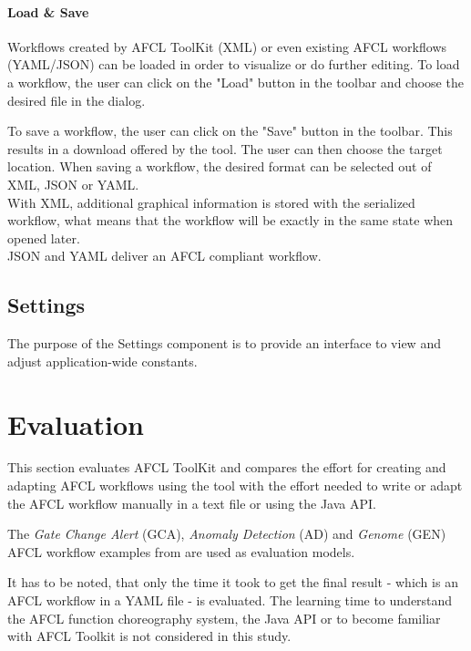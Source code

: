 \documentclass[a4paper,top=25mm,bottom=25mm,12pt,pdftex,halfparskip,twoside,bibtotoc,numbers=noenddot]{scrbook}
\begin{document}
\subsubsection{Load \& Save}

Workflows created by AFCL ToolKit (XML) or even existing AFCL workflows (YAML/JSON) can be loaded in order to visualize or do further editing. To load a workflow, the user can click on the "Load" button in the toolbar and choose the desired file in the dialog.

To save a workflow, the user can click on the "Save" button in the toolbar.
This results in a download offered by the tool. The user can then choose the target location.  When saving a workflow, the desired format can be selected out of XML, JSON or YAML.\\
With XML, additional graphical information is stored with the serialized workflow, what means that the workflow will be exactly in the same state when opened later.\\
JSON and YAML deliver an AFCL compliant workflow.

\section{Settings}


The purpose of the Settings component is to provide an interface to view and adjust application-wide constants. 


\chapter{Evaluation}
\label{chap:evaluation}

This section evaluates AFCL ToolKit and compares the effort for creating and adapting AFCL workflows using the tool with the effort needed to write or adapt the AFCL workflow manually in a text file or using the Java API.

The \textit{Gate Change Alert}  (GCA), \textit{Anomaly Detection} (AD) and \textit{Genome} (GEN) AFCL workflow examples from \citep{online-afcl-dps} are used as evaluation models.

It has to be noted, that only the time it took to get the final result - which is an AFCL workflow in a YAML file - is evaluated.
The learning time to understand the AFCL function choreography system, the Java API or to become familiar with AFCL Toolkit is not considered in this study.
\end{document}
